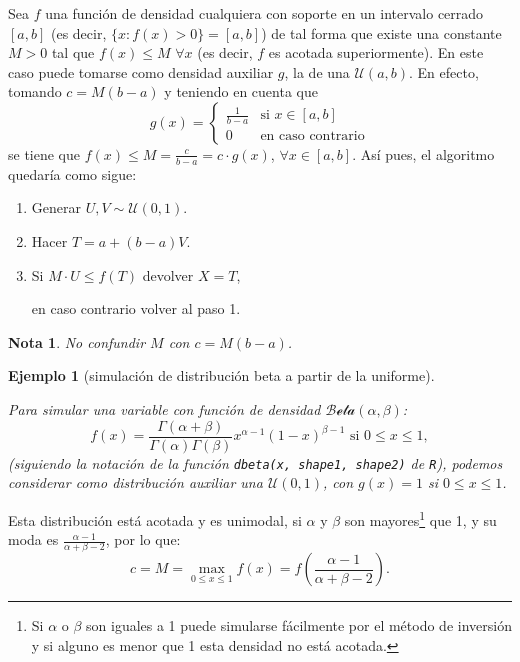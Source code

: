 \documentclass[
]{book}
\theoremstyle{break}
\newtheorem{example}{Ejemplo}[chapter]
\theoremstyle{nonumberplain}
\newtheorem{remark}{Nota}
\begin{document}
Sea \(f\) una función de densidad cualquiera con soporte en un intervalo cerrado \([a,b]\) (es decir, \(\{x : f(x) > 0\}=[a,b]\)) de tal forma que existe una constante \(M>0\) tal que \(f(x) \leq M\) \(\forall x\) (es decir, \(f\) es acotada superiormente).
En este caso puede tomarse como densidad auxiliar \(g\), la de una \(\mathcal{U}(a,b)\).
En efecto, tomando \(c = M\left( b-a\right)\) y teniendo en cuenta que
\[g(x) = \left\{
\begin{array}{ll}\frac{1}{b-a} & \text{si } x \in [a,b]\\
0 & \text{en caso contrario}
\end{array} \right.\]
se tiene que \(f(x) \leq M = \frac{c}{b-a}=c \cdot g(x)\),
\(\forall x \in [a,b]\).
Así pues, el algoritmo quedaría como sigue:

\begin{enumerate}
\def\labelenumi{\arabic{enumi}.}
\item
  Generar \(U,V\sim \mathcal{U}(0, 1)\).
\item
  Hacer \(T = a + \left( b-a \right) V\).
\item
  Si \(M \cdot U\leq f\left( T \right)\)
  devolver \(X = T\),

  en caso contrario volver al paso 1.
\end{enumerate}

\begin{remark}
No confundir \(M\) con \(c = M \left( b - a \right)\).
\end{remark}

\begin{example}[simulación de distribución beta a partir de la uniforme]
\protect\hypertarget{exm:dbeta-dunif-ar}{}\label{exm:dbeta-dunif-ar}

Para simular una variable con función de densidad \(\mathcal{Beta}(\alpha, \beta)\):
\[f(x)=\frac{\Gamma (\alpha + \beta )}{\Gamma (\alpha )\Gamma (\beta )}
x^{\alpha -1}(1-x)^{\beta -1}\text{ si }0 \leq x \leq 1,\]
(siguiendo la notación de la función \texttt{dbeta(x,\ shape1,\ shape2)} de \texttt{R}), podemos considerar como distribución auxiliar una \(\mathcal{U}(0,1)\),
con \(g(x) = 1\) si \(0 \leq x \leq 1\).
\end{example}

Esta distribución está acotada y es unimodal, si \(\alpha\) y \(\beta\) son mayores\footnote{Si \(\alpha\) o \(\beta\) son iguales a 1 puede simularse fácilmente por el método de inversión y si alguno es menor que 1 esta densidad no está acotada.} que 1, y su moda es \(\frac{\alpha - 1} {\alpha + \beta - 2}\), por lo que:
\[c = M = \max_{0 \leq x \leq 1}f(x) = f\left( \frac{\alpha - 1} {\alpha + \beta - 2} \right).\]
\end{document}
